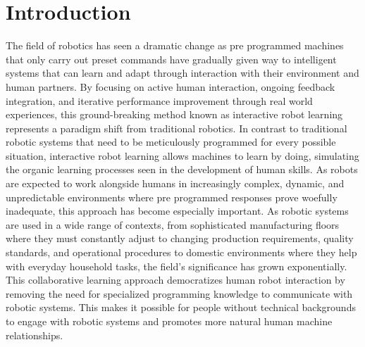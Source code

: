 \documentclass[report.tex]{subfiles}
\begin{document}
    \chapter{Introduction}
 The field of robotics has seen a dramatic change as pre programmed machines that only carry out preset commands have gradually given way to intelligent systems that can learn and adapt through interaction with their environment and human partners.  By focusing on active human interaction, ongoing feedback integration, and iterative performance improvement through real world experiences, this ground-breaking method known as interactive robot learning represents a paradigm shift from traditional robotics.  In contrast to traditional robotic systems that need to be meticulously programmed for every possible situation, interactive robot learning allows machines to learn by doing, simulating the organic learning processes seen in the development of human skills.  As robots are expected to work alongside humans in increasingly complex, dynamic, and unpredictable environments where pre programmed responses prove woefully inadequate, this approach has become especially important.  As robotic systems are used in a wide range of contexts, from sophisticated manufacturing floors where they must constantly adjust to changing production requirements, quality standards, and operational procedures to domestic environments where they help with everyday household tasks, the field's significance has grown exponentially.  This collaborative learning approach democratizes human robot interaction by removing the need for specialized programming knowledge to communicate with robotic systems. This makes it possible for people without technical backgrounds to engage with robotic systems and promotes more natural human machine relationships.\\\\
\end{document}
